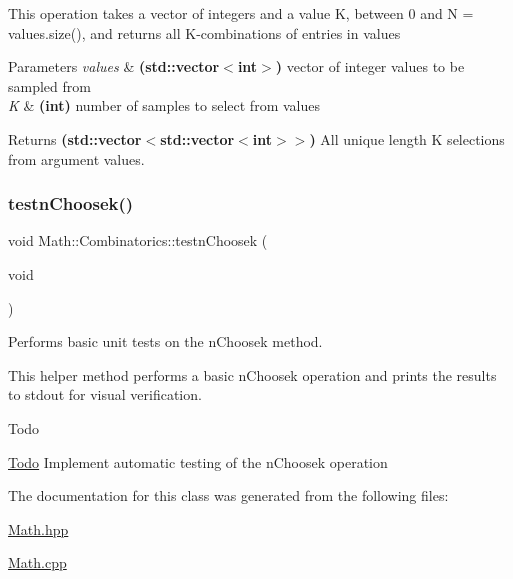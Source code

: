 This operation takes a vector of integers and a value K, between 0 and N = values.\+size(), and returns all K-\/combinations of entries in values 
\begin{DoxyParams}{Parameters}
{\em values} & {\bfseries (std\+::vector$<$int$>$)} vector of integer values to be sampled from \\
\hline
{\em K} & {\bfseries (int)} number of samples to select from values \\
\hline
\end{DoxyParams}
\begin{DoxyReturn}{Returns}
{\bfseries (std\+::vector$<$std\+::vector$<$int$>$$>$)} All unique length K selections from argument values. 
\end{DoxyReturn}
\mbox{\label{class_math_1_1_combinatorics_a174253b11651917aab46bc879449e59b}} 
\subsubsection{\texorpdfstring{testn\+Choosek()}{testnChoosek()}}
{\footnotesize\ttfamily void Math\+::\+Combinatorics\+::testn\+Choosek (\begin{DoxyParamCaption}\item[{void}]{ }\end{DoxyParamCaption})}



Performs basic unit tests on the n\+Choosek method. 

This helper method performs a basic n\+Choosek operation and prints the results to stdout for visual verification. \begin{DoxyRefDesc}{Todo}
\item[\mbox{\hyperlink{todo__todo000002}{Todo}}]Implement automatic testing of the n\+Choosek operation \end{DoxyRefDesc}


The documentation for this class was generated from the following files\+:\begin{DoxyCompactItemize}
\item 
\mbox{\hyperlink{_math_8hpp}{Math.\+hpp}}\item 
\mbox{\hyperlink{_math_8cpp}{Math.\+cpp}}\end{DoxyCompactItemize}
